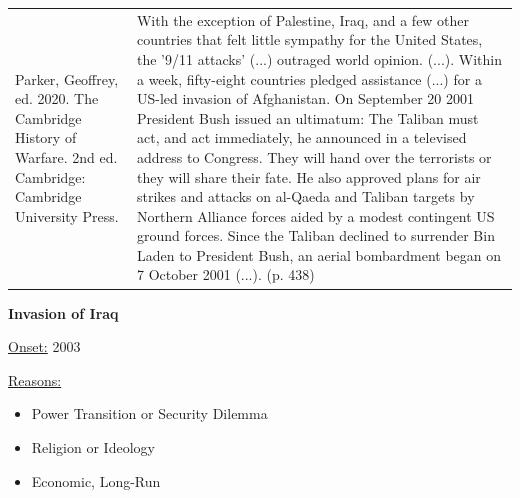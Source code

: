 {\begin{longtable}{p{}p{}}
\\
Parker, Geoffrey, ed. 2020. The Cambridge History of Warfare. 2nd ed. Cambridge: Cambridge University Press. & With the exception of Palestine, Iraq, and a few other countries that felt little sympathy for the United States, the '9/11 attacks' (...) outraged world opinion. (...). Within a week, fifty-eight countries pledged assistance (...) for a US-led invasion of Afghanistan. On September 20 2001 President Bush issued an ultimatum: The Taliban must act, and act immediately, he announced in a televised address to Congress. They will hand over the terrorists or they will share their fate. He also approved plans for air strikes and attacks on al-Qaeda and Taliban targets by Northern Alliance forces aided by a modest contingent US ground forces. Since the Taliban declined to surrender Bin Laden to President Bush, an aerial bombardment began on 7 October 2001 (...). (p. 438)
\\
\end{longtable}}
\clearpage
         \textbf{Invasion of Iraq} 

          \underline{Onset:} 2003         

\underline{Reasons:}
\begin{itemize}
\item Power Transition or Security Dilemma
\item Religion or Ideology
\item Economic, Long-Run
\end{itemize}

